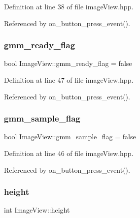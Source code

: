 Definition at line 38 of file image\+View.\+hpp.



Referenced by on\+\_\+button\+\_\+press\+\_\+event().

\mbox{\label{class_image_view_abf9a90b70c0fb02bf94a35e4a98ae50b}} 
\subsubsection{\texorpdfstring{gmm\+\_\+ready\+\_\+flag}{gmm\_ready\_flag}}
{\footnotesize\ttfamily bool Image\+View\+::gmm\+\_\+ready\+\_\+flag = false}



Definition at line 47 of file image\+View.\+hpp.



Referenced by on\+\_\+button\+\_\+press\+\_\+event().

\mbox{\label{class_image_view_a8256ad985182f4fdb62f15d48c9ddc9f}} 
\subsubsection{\texorpdfstring{gmm\+\_\+sample\+\_\+flag}{gmm\_sample\_flag}}
{\footnotesize\ttfamily bool Image\+View\+::gmm\+\_\+sample\+\_\+flag = false}



Definition at line 46 of file image\+View.\+hpp.



Referenced by on\+\_\+button\+\_\+press\+\_\+event().

\mbox{\label{class_image_view_a3e4a6ddf0a10ae710405cdd6e73924f6}} 
\subsubsection{\texorpdfstring{height}{height}}
{\footnotesize\ttfamily int Image\+View\+::height}



